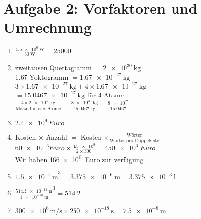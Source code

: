 \documentclass{gadsescript}
\begin{document}
\section*{Aufgabe 2: Vorfaktoren und Umrechnung}
\begin{enumerate}[label=\alph*)]
	\item $ \frac{\qty{1.5e6}{\watt}}{\qty{60}{\watt}} = 25000 $
	\item zweitausen  Quettagramm $ = \qty{2e30}{\kilogram} $\\
		\num{1.67} Yoktogramm $ = \qty{1.67e-27}{\kilogram} $\\
		$ 3 \times \qty{1.67e-27}{\kilogram} + 4 \times \qty{1.67e-27}{\kilogram} $\\
		$ = \qty{15.0467e-27}{\kilogram} $ für 4 Atome\\
		$ \frac{4\times\qty{2e30}{\kilogram}}{\text{Masse für vier Atome}} = \frac{\qty{8e30}{\kilogram}}{\qty{15.0467}{\kilogram}} = \frac{\num{8e57}}{\num{15.0467}} $
	\item $ \qty{2.4e9}{Euro} $
	\item Kosten $ \times $ Anzahl $ = $ Kosten $ \times \frac{\text{Wörter}}{\text{Wörter pro Doppelseite}} $\\
		$ \num{60e-3}Euro \times \frac{\num{4.5e9}}{2 \times 300} = \qty{450e3}{Euro}$\\
		Wir haben \qty{466e6}{Euro} zur verfügung
	\item $ \qty{1.5e-2}{\metre}^3 = \qty{3.375e-6}{\metre} = \qty{3.375e-3}{\litre} $
	\item $ \frac{\qty{514.2e-12}{\metre}}{\qty{1e-10}{\metre}}^3 = \num{514.2} $
	\item $ \qty{300e6}{\metre\per\second} \times \qty{250e-18}{\second} = \qty{7.5e-8}{\metre} $
\end{enumerate}
\end{document}
